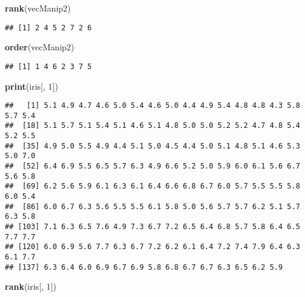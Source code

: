\documentclass[]{book}
\newenvironment{Shaded}{\begin{snugshade}}{\end{snugshade}}
\newcommand{\KeywordTok}[1]{\textcolor[rgb]{0.13,0.29,0.53}{\textbf{#1}}}
\newcommand{\DecValTok}[1]{\textcolor[rgb]{0.00,0.00,0.81}{#1}}
\newcommand{\NormalTok}[1]{#1}
\theoremstyle{definition}
\theoremstyle{definition}
\theoremstyle{definition}
\theoremstyle{remark}
\begin{document}
\begin{Shaded}
\begin{Highlighting}[]
\KeywordTok{rank}\NormalTok{(vecManip2)}
\end{Highlighting}
\end{Shaded}

\begin{verbatim}
## [1] 2 4 5 2 7 2 6
\end{verbatim}

\begin{Shaded}
\begin{Highlighting}[]
\KeywordTok{order}\NormalTok{(vecManip2)}
\end{Highlighting}
\end{Shaded}

\begin{verbatim}
## [1] 1 4 6 2 3 7 5
\end{verbatim}

\begin{Shaded}
\begin{Highlighting}[]
\KeywordTok{print}\NormalTok{(iris[, }\DecValTok{1}\NormalTok{])}
\end{Highlighting}
\end{Shaded}

\begin{verbatim}
##   [1] 5.1 4.9 4.7 4.6 5.0 5.4 4.6 5.0 4.4 4.9 5.4 4.8 4.8 4.3 5.8 5.7 5.4
##  [18] 5.1 5.7 5.1 5.4 5.1 4.6 5.1 4.8 5.0 5.0 5.2 5.2 4.7 4.8 5.4 5.2 5.5
##  [35] 4.9 5.0 5.5 4.9 4.4 5.1 5.0 4.5 4.4 5.0 5.1 4.8 5.1 4.6 5.3 5.0 7.0
##  [52] 6.4 6.9 5.5 6.5 5.7 6.3 4.9 6.6 5.2 5.0 5.9 6.0 6.1 5.6 6.7 5.6 5.8
##  [69] 6.2 5.6 5.9 6.1 6.3 6.1 6.4 6.6 6.8 6.7 6.0 5.7 5.5 5.5 5.8 6.0 5.4
##  [86] 6.0 6.7 6.3 5.6 5.5 5.5 6.1 5.8 5.0 5.6 5.7 5.7 6.2 5.1 5.7 6.3 5.8
## [103] 7.1 6.3 6.5 7.6 4.9 7.3 6.7 7.2 6.5 6.4 6.8 5.7 5.8 6.4 6.5 7.7 7.7
## [120] 6.0 6.9 5.6 7.7 6.3 6.7 7.2 6.2 6.1 6.4 7.2 7.4 7.9 6.4 6.3 6.1 7.7
## [137] 6.3 6.4 6.0 6.9 6.7 6.9 5.8 6.8 6.7 6.7 6.3 6.5 6.2 5.9
\end{verbatim}

\begin{Shaded}
\begin{Highlighting}[]
\KeywordTok{rank}\NormalTok{(iris[, }\DecValTok{1}\NormalTok{])}
\end{Highlighting}
\end{Shaded}
\end{document}
